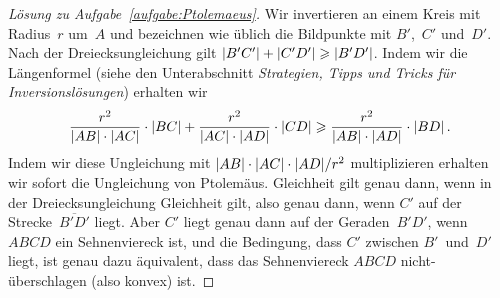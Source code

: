 \begin{proof}[Lösung zu Aufgabe~\ref{aufgabe:Ptolemaeus}]
	Wir invertieren an einem Kreis mit Radius~$r$ um~$A$ und bezeichnen wie üblich die Bildpunkte mit $B'$,~$C'$ und~$D'$. Nach der Dreiecksungleichung gilt $\lvert B'C'\rvert+\lvert C'D'\rvert\geqslant \lvert B'D'\rvert$. Indem wir die Längenformel (siehe den Unterabschnitt \emph{Strategien, Tipps und Tricks für Inversionslösungen}) erhalten wir
	\begin{equation*}
		\frac{r^2}{\lvert AB\rvert\cdot\lvert AC\rvert}\cdot \lvert BC\rvert+\frac{r^2}{\lvert AC\rvert\cdot\lvert AD\rvert}\cdot \lvert CD\rvert\geqslant \frac{r^2}{\lvert AB\rvert\cdot\lvert AD\rvert}\cdot\lvert BD\rvert\,.
	\end{equation*}
	Indem wir diese Ungleichung mit $\lvert AB\rvert\cdot\lvert AC\rvert\cdot \lvert AD\rvert/r^2$ multiplizieren erhalten wir sofort die Ungleichung von Ptolemäus. Gleichheit gilt genau dann, wenn in der Dreiecksungleichung Gleichheit gilt, also genau dann, wenn $C'$ auf der Strecke~$\overline{B'D'}$ liegt. Aber $C'$ liegt genau dann auf der Geraden~$B'D'$, wenn $ABCD$ ein Sehnenviereck ist, und die Bedingung, dass $C'$ zwischen $B'$~und~$D'$ liegt, ist genau dazu äquivalent, dass das Sehnenviereck $ABCD$ nicht-überschlagen (also konvex) ist.
\end{proof}